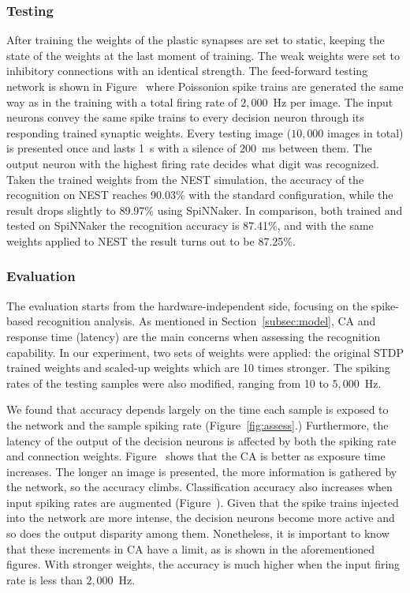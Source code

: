 \documentclass{frontiersENG} %
\begin{document}
\subsubsection{Testing}
After training the weights of the plastic synapses are set to static, keeping the state of the weights at the last moment of training.
The weak weights were set to inhibitory connections with an identical strength.
The feed-forward testing network is shown in Figure~ where Poissonion spike trains are generated the same way as in the training with a total firing rate of $2,000$~Hz per image.
The input neurons convey the same spike trains to every decision neuron through its responding trained synaptic weights. 
Every testing image ($10,000$ images in total) is presented once and lasts 1~s with a silence of 200~ms between them.
The output neuron with the highest firing rate decides what digit was recognized.
Taken the trained weights from the NEST simulation, the accuracy of the recognition on NEST reaches 90.03\% with the standard configuration, while the result drops slightly to 89.97\% using SpiNNaker.
In comparison, both trained and tested on SpiNNaker the recognition accuracy is 87.41\%, and with the same weights applied to NEST the result turns out to be 87.25\%. 

\subsubsection{Evaluation}
The evaluation starts from the hardware-independent side, focusing on the spike-based recognition analysis.
As mentioned in Section~\ref{subsec:model}, CA and response time (latency) are the main concerns when assessing the recognition capability.
In our experiment, two sets of weights were applied: the original STDP trained weights and scaled-up weights which are 10 times stronger.
The spiking rates of the testing samples were also modified, ranging from 10 to $5,000$~Hz.

We found that accuracy depends largely on the time each sample is exposed to the network and the sample spiking rate (Figure~\ref{fig:assess}.)
Furthermore, the latency of the output of the decision neurons is affected by both the spiking rate and connection weights.
Figure~ shows that the CA is better as exposure time increases. The longer an image is presented, the more information is gathered by the network, so the accuracy climbs.
Classification accuracy also increases when input spiking rates are augmented (Figure~).
Given that the spike trains injected into the network are more intense, the decision neurons become more active and so does the output disparity among them.
Nonetheless, it is important to know that these increments in CA have a limit, as is shown in the aforementioned figures.
With stronger weights, the accuracy is much higher when the input firing rate is less than $2,000$~Hz.
\end{document}
